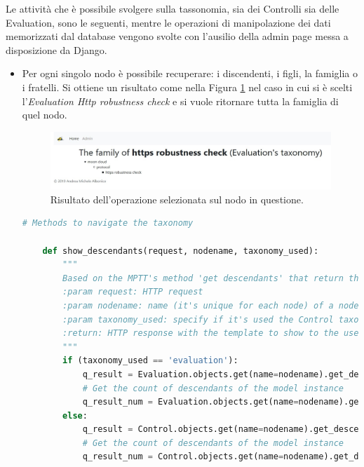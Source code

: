 %
Le attività che è possibile svolgere sulla tassonomia, sia dei Controlli sia delle Evaluation, sono le seguenti, mentre le operazioni 
di manipolazione dei dati memorizzati dal database vengono svolte con l'ausilio della admin page messa a disposizione da Django.\hfill\break
\begin{itemize}
    \item Per ogni singolo nodo è possibile recuperare: i discendenti, i figli, la famiglia o i fratelli. Si ottiene un risultato come nella 
    Figura \ref{fig:MCRS_taxnodedetails} nel caso in cui si è scelti l'\textit{Evaluation Http robustness check} e si vuole ritornare tutta la 
    famiglia di quel nodo.
    \begin{figure}[ht!]
        \centering
        \includegraphics[scale=0.4]{images/MCRS_taxnodedetails.jpg}
        \caption[Risultato dell'operazione selezionata sul nodo in questione]{Risultato dell'operazione selezionata sul nodo in questione.}
        \label{fig:MCRS_taxnodedetails}
    \end{figure}
    \lstset{style=python_code_style}
    \begin{lstlisting}[language=Python, label=lst:view_tax_nodedetails, caption={Codice utilizzato all'interno delle View per 
        implementare le operazioni per restituire i discendenti, i figli, la famiglia o i fratelli.}]
    # Methods to navigate the taxonomy
 
    def show_descendants(request, nodename, taxonomy_used):
        """
        Based on the MPTT's method 'get descendants' that return the descendants of a model instance, in tree order
        :param request: HTTP request
        :param nodename: name (it's unique for each node) of a node in the taxonomy
        :param taxonomy_used: specify if it's used the Control taxonomy or the Evaluation taxonomy
        :return: HTTP response with the template to show to the user
        """
        if (taxonomy_used == 'evaluation'):
            q_result = Evaluation.objects.get(name=nodename).get_descendants(include_self=False)
            # Get the count of descendants of the model instance
            q_result_num = Evaluation.objects.get(name=nodename).get_descendant_count()
        else:
            q_result = Control.objects.get(name=nodename).get_descendants(include_self=False)
            # Get the count of descendants of the model instance
            q_result_num = Control.objects.get(name=nodename).get_descendant_count()
 

\end{lstlisting}
\end{itemize}
